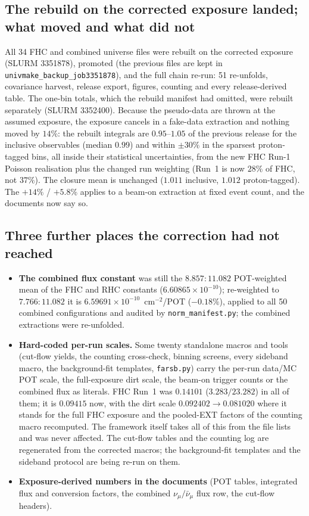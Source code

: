 \subsection{The rebuild on the corrected exposure landed; what moved and what did not}
All 34 FHC and combined universe files were rebuilt on the corrected exposure (SLURM 3351878),
promoted (the previous files are kept in \texttt{univmake\_backup\_job3351878}), and the full chain
re-run: 51 re-unfolds, covariance harvest, release export, figures, counting and every
release-derived table. The one-bin totals, which the rebuild manifest had omitted, were rebuilt
separately (SLURM 3352400). Because the pseudo-data are thrown at the assumed exposure, the
exposure cancels in a fake-data extraction and nothing moved by $14\%$: the rebuilt integrals are
$0.95$--$1.05$ of the previous release for the inclusive observables (median $0.99$) and within
$\pm30\%$ in the sparsest proton-tagged bins, all inside their statistical uncertainties, from the
new FHC Run-1 Poisson realisation plus the changed run weighting (Run~1 is now $28\%$ of FHC,
not $37\%$). The closure mean is unchanged ($1.011$ inclusive, $1.012$ proton-tagged). The
$+14\%$ / $+5.8\%$ applies to a beam-on extraction at fixed event count, and the documents now say
so.

\subsection{Three further places the correction had not reached}
\begin{itemize}\itemsep2pt
  \item \textbf{The combined flux constant} was still the $8.857:11.082$ POT-weighted mean of the
    FHC and RHC constants ($6.60865\times10^{-10}$); re-weighted to $7.766:11.082$ it is
    $6.59691\times10^{-10}$~cm$^{-2}$/POT ($-0.18\%$), applied to all 50 combined configurations
    and audited by \texttt{norm\_manifest.py}; the combined extractions were re-unfolded.
  \item \textbf{Hard-coded per-run scales.} Some twenty standalone macros and tools (cut-flow
    yields, the counting cross-check, binning screens, every sideband macro, the background-fit
    templates, \texttt{farsb.py}) carry the per-run data/MC POT scale, the full-exposure dirt scale,
    the beam-on trigger counts or the combined flux as literals. FHC Run~1 was $0.14101$
    ($3.283/23.282$) in all of them; it is $0.09415$ now, with the dirt scale $0.092402\to0.081020$
    where it stands for the full FHC exposure and the pooled-EXT factors of the counting macro
    recomputed. The framework itself takes all of this from the file lists and was never affected.
    The cut-flow tables and the counting log are regenerated from the corrected macros; the
    background-fit templates and the sideband protocol are being re-run on them.
  \item \textbf{Exposure-derived numbers in the documents} (POT tables, integrated flux and
    conversion factors, the combined $\nu_\mu/\bar\nu_\mu$ flux row, the cut-flow headers).
\end{itemize}


